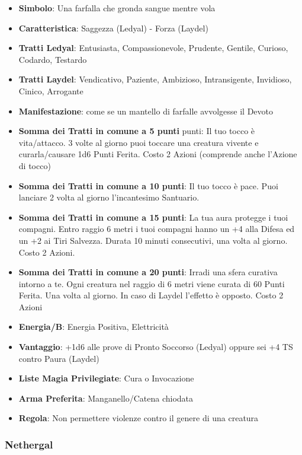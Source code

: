 \begin{multicols}{2}
\begin{itemize}[leftmargin=*] \setlength{\itemsep}{0pt}
\item \textbf{Simbolo}: Una farfalla che gronda sangue mentre vola
\item \textbf{Caratteristica}: Saggezza (Ledyal) - Forza (Laydel)
\item \textbf{Tratti Ledyal}: Entusiasta, Compassionevole, Prudente, Gentile, Curioso, Codardo, Testardo
\item \textbf{Tratti Laydel}: Vendicativo, Paziente, Ambizioso, Intransigente, Invidioso, Cinico, Arrogante
\item \textbf{Manifestazione}: come se un mantello di farfalle avvolgesse il Devoto
\item \textbf{Somma dei Tratti in comune a 5 punti} punti: Il tuo tocco è vita/attacco. 3 volte al giorno puoi toccare una creatura vivente e curarla/causare 1d6 Punti Ferita. Costo 2 Azioni (comprende anche l'Azione di tocco)
\item \textbf{Somma dei Tratti in comune a 10 punti}: Il tuo tocco è pace. Puoi lanciare 2 volta al giorno l'incantesimo Santuario.
\item \textbf{Somma dei Tratti in comune a 15 punti}: La tua aura protegge i tuoi compagni. Entro raggio 6 metri i tuoi compagni hanno un +4 alla Difesa ed un +2 ai Tiri Salvezza. Durata 10 minuti consecutivi, una volta al giorno. Costo 2 Azioni.
\item \textbf{Somma dei Tratti in comune a 20 punti}: Irradi una sfera curativa intorno a te. Ogni creatura nel raggio di 6 metri viene curata di 60 Punti Ferita. Una volta al giorno. In caso di Laydel l'effetto è opposto. Costo 2 Azioni
\item \textbf{Energia/B}: Energia Positiva, Elettricità
\item \textbf{Vantaggio}: +1d6 alle prove di Pronto Soccorso (Ledyal) oppure sei +4 TS contro Paura (Laydel)
\item \textbf{Liste Magia Privilegiate}: Cura o Invocazione
\item \textbf{Arma Preferita}: Manganello/Catena chiodata
\item \textbf{Regola}: Non permettere violenze contro il genere di una creatura
\end{itemize}

\subsubsection{Nethergal}\label{nethergal}\hypertarget{nethergal}{}


\end{multicols}
